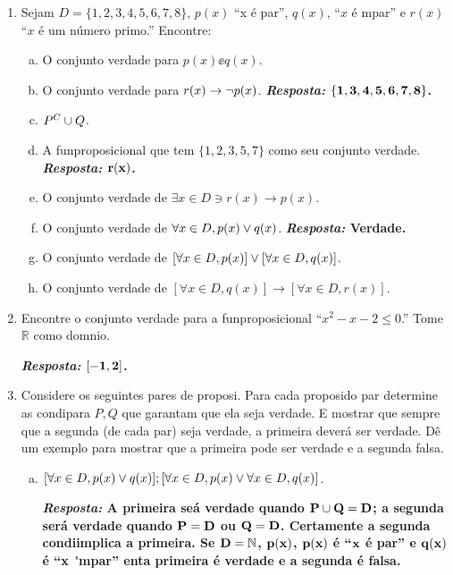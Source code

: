 \begin{enumerate}[{\bf 1.}]
\item Sejam $D=\{1,2,3,4,5,6,7,8\}$, $p(x)$ ``x \'e par'', $q(x)$, ``$x$ \'e \ih mpar'' e $r(x)$ ``$x$ \'e um n\'umero primo.'' Encontre:
\begin{enumerate}[a)]
\item O conjunto verdade para $p(x)\ee q(x)$.
\item O conjunto verdade para $r(x)\to\lnot p(x)$.  {\bf{\it Resposta:} ${\bf \{1,3,4,5,6,7,8\}}$.}
\item $P^C\cup Q$.
\item A fun\cao proposicional que tem $\{1,2,3,5,7\}$ como seu conjunto verdade. {\bf{\it Resposta:} ${\bf r(x)}$.}
\item O conjunto verdade de $\exists x \in D \ni r(x)\to p(x)$.
\item O conjunto verdade de $\forall x\in D, p(x)\vee q(x)$. {\bf{\it Resposta:} Verdade.}
\item O conjunto verdade de $[\forall x\in D, p(x)]\vee[\forall x\in D, q(x)]$. 
\item O conjunto verdade de $[\forall x\in D, q(x)]\to[\forall x\in D, r(x)]$.
\end{enumerate}

\item Encontre o conjunto verdade para a fun\cao proposicional ``$x^2-x-2\leq 0$.'' Tome $\mathbb{R}$ como dom\ih nio.

{\bf{\it Resposta:} ${\bf [-1,2]}$.}

\item Considere os seguintes pares de proposi\cois. Para cada proposi\cao do par determine as condi\coes para $P,Q$ que garantam que ela seja verdade. E mostrar que sempre que a segunda (de cada par) seja verdade, a primeira dever\'a ser verdade. D\^e um exemplo para mostrar que a primeira pode ser verdade e a segunda falsa.
\begin{enumerate}[a)]
\item $[\forall x\in D, p(x)\vee q(x)]; [\forall x\in D, p(x) \vee \forall x \in D, q(x)]$.

{\bf{\it Resposta:} A primeira se\'a verdade quando ${\bf P\cup Q=D}$; a segunda ser\'a verdade quando ${\bf P=D}$ ou ${\bf Q=D}$. Certamente a segunda condi\cao implica a primeira. Se ${\bf D=\mathbb{N}}$, ${\bf p(x)}$, ${\bf p(x)}$ \'e ``${\bf x}$ \'e par'' e ${\bf q(x)}$ \'e ``${\bf x}$ \' \ih mpar'' ent\ao a primeira \'e verdade e a segunda \'e falsa.}


\end{enumerate}
\end{enumerate}
